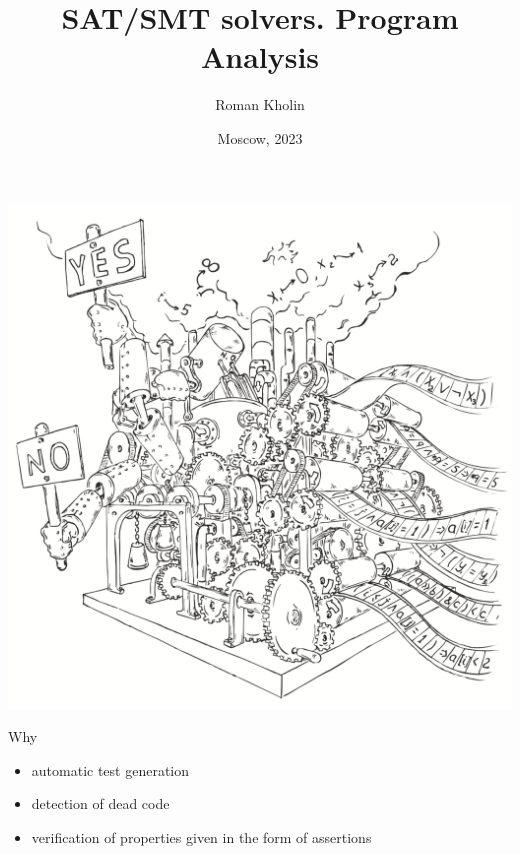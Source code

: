 \documentclass{beamer}
\begin{document}
\title{SAT/SMT solvers. Program Analysis}
\author{Roman Kholin}
\date{Moscow, 2023}

\begin{frame}
\includegraphics[scale=0.5]{../decision-procedure.png}
\end{frame}

\frame{\titlepage}

\begin{frame}{Why}
\begin{itemize}
\item automatic test generation
\item detection of dead code
\item verification of properties given in the form of assertions
\end{itemize}
\end{frame}
\end{document}
